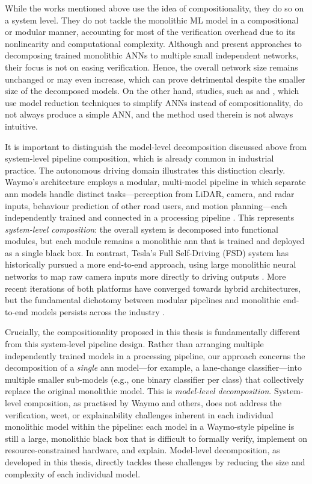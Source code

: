 While the works mentioned above use the idea of compositionality, they do so on a system level. They do not tackle the monolithic ML model in a compositional or modular manner, accounting for most of the verification overhead due to its nonlinearity and computational complexity. Although \cite{watanabe_modular_2017} and \cite{pan_decomposing_2020} present approaches to decomposing trained monolithic ANNs to multiple small independent networks, their focus is not on easing verification. Hence, the overall network size remains unchanged or may even increase, which can prove detrimental despite the smaller size of the decomposed models. On the other hand, studies, such as \cite{gokulanathan_simplifying_2020} and \cite{elboher_abstraction-based_2020}, which use model reduction techniques to simplify ANNs instead of compositionality, do not always produce a simple ANN, and the method used therein is not always intuitive. 

It is important to distinguish the model-level decomposition discussed above from system-level pipeline composition, which is already common in industrial practice. The autonomous driving domain illustrates this distinction clearly. Waymo's architecture employs a modular, multi-model pipeline in which separate \gls{ann} models handle distinct tasks---perception from LiDAR, camera, and radar inputs, behaviour prediction of other road users, and motion planning---each independently trained and connected in a processing pipeline \cite{sun_scalability_2020, bansal_chauffeurnet_2019}. This represents \emph{system-level composition}: the overall system is decomposed into functional modules, but each module remains a monolithic \gls{ann} that is trained and deployed as a single black box. In contrast, Tesla's Full Self-Driving (FSD) system has historically pursued a more end-to-end approach, using large monolithic neural networks to map raw camera inputs more directly to driving outputs \cite{chen_end--end_2024, tampuu_survey_2022}. More recent iterations of both platforms have converged towards hybrid architectures, but the fundamental dichotomy between modular pipelines and monolithic end-to-end models persists across the industry \cite{chen_end--end_2024}.

Crucially, the compositionality proposed in this thesis is fundamentally different from this system-level pipeline design. Rather than arranging multiple independently trained models in a processing pipeline, our approach concerns the decomposition of a \emph{single} \gls{ann} model---for example, a lane-change classifier---into multiple smaller sub-models (e.g., one binary classifier per class) that collectively replace the original monolithic model. This is \emph{model-level decomposition}. System-level composition, as practised by Waymo and others, does not address the verification, \gls{wcet}, or explainability challenges inherent in each individual monolithic model within the pipeline: each model in a Waymo-style pipeline is still a large, monolithic black box that is difficult to formally verify, implement on resource-constrained hardware, and explain. Model-level decomposition, as developed in this thesis, directly tackles these challenges by reducing the size and complexity of each individual model.

